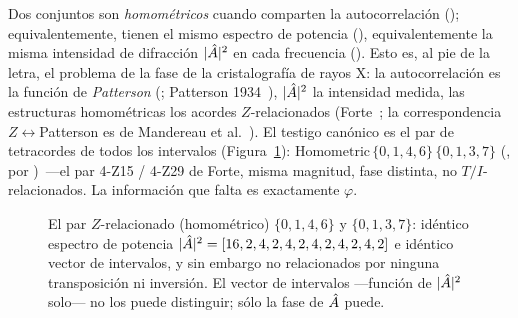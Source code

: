 Dos conjuntos son \emph{homométricos} cuando comparten la autocorrelación ();
equivalentemente, tienen el mismo espectro de potencia (),
equivalentemente la misma intensidad de difracción $|\hat{A}|^2$ en cada frecuencia
(). Esto es, al pie de la letra, el problema de la fase de la
cristalografía de rayos X: la autocorrelación es la función de \emph{Patterson} (;
Patterson 1934~\cite{Patterson}), $|\hat{A}|^2$ la intensidad medida, las estructuras homométricas los
acordes $Z$-relacionados (Forte~\cite{Forte}; la correspondencia $Z\leftrightarrow$Patterson es de
Mandereau et al.~\cite{MAAA}). El testigo canónico es el par de tetracordes de todos los intervalos
(Figura~\ref{fig:p1-zpair}): $\mathrm{Homometric}\,\{0,1,4,6\}\,\{0,1,3,7\}$
(, por )\, ---el par 4-Z15 / 4-Z29
de Forte, misma magnitud, fase distinta, no $T/I$-relacionados. La información que falta es exactamente
$\varphi$.

\begin{figure}[ht]
\centering
{}
\caption{El par $Z$-relacionado (homométrico) $\{0,1,4,6\}$ y $\{0,1,3,7\}$: idéntico espectro de potencia
$|\hat{A}|^2=[16,2,4,2,4,2,4,2,4,2,4,2]$ e idéntico vector de intervalos, y sin embargo no relacionados por
ninguna transposición ni inversión. El vector de intervalos ---función de $|\hat{A}|^2$ solo--- no los puede
distinguir; sólo la fase de $\hat{A}$ puede.}
\label{fig:p1-zpair}
\end{figure}


